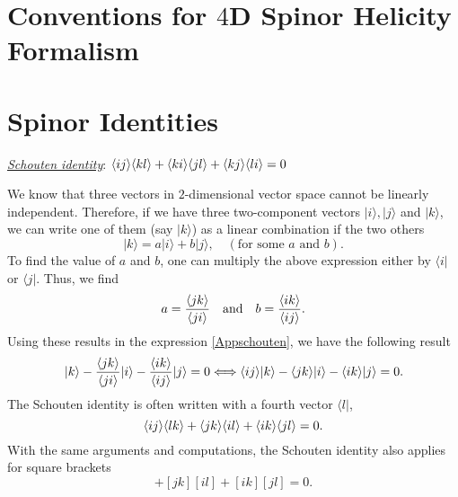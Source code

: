 \appendix
\setcounter{chapter}{0}
\renewcommand{\chaptername}{Appendix}
\renewcommand{\theequation}{\Alph{chapter}.\arabic{section}.\arabic{equation}}
\setcounter{equation}{0}


\chapter{Conventions for $4$D Spinor Helicity Formalism}


\chapter{Spinor Identities}

\underline{\textit{Schouten identity}}: $\langle ij\rangle\langle kl\rangle+\langle ki\rangle\langle jl\rangle+\langle kj\rangle\langle li\rangle=0$

\noindent We know that three vectors in $2$-dimensional vector space cannot be linearly independent. Therefore, if we have three two-component vectors $\vert i\rangle ,\vert j\rangle$ and $\vert k\rangle$, we can write one of them (say $\vert k\rangle$) as a linear combination if the two others
\begin{equation}
\vert k\rangle =a\vert i\rangle + b\vert j\rangle, \quad (\text{for some } a \text{ and } b) .
\label{Appschouten}
\end{equation}
To find the value of $a$ and $b$, one can multiply the above expression either by $\langle i\vert$ or $\langle j\vert$. Thus, we find
\begin{equation}
a=\frac{\langle jk\rangle}{\langle ji\rangle} \quad \text{and} \quad b=\frac{\langle ik\rangle}{\langle ij\rangle}.
\end{equation}
Using these results in the expression \ref{Appschouten}, we have the following result
\begin{equation}
\vert k\rangle -\frac{\langle jk\rangle}{\langle ji\rangle} \vert i\rangle - \frac{\langle ik\rangle}{\langle ij\rangle} \vert j \rangle =0 \Longleftrightarrow \langle ij\rangle\vert k\rangle -\langle jk\rangle \vert i\rangle -\langle ik\rangle\vert j\rangle=0.
\end{equation}
The Schouten identity is often written with a fourth vector $\langle l\vert$,
\begin{equation}
\langle ij\rangle\langle lk\rangle+\langle jk\rangle\langle il\rangle+\langle ik\rangle\langle jl\rangle=0.
\label{schoutenangle}
\end{equation}
With the same arguments and computations, the Schouten identity also applies for square brackets
\begin{equation}
[ij] [lk]+[jk] [il]+[ik] [jl]=0.
\end{equation}

